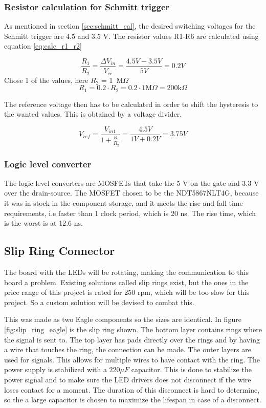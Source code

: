 \subsubsection*{Resistor calculation for Schmitt trigger}
As mentioned in section \ref{sec:schmitt_cal}, the desired switching voltages for the Schmitt trigger are 4.5 and 3.5 V.
The resistor values R1-R6 are calculated using equation \ref{eq:calc_r1_r2}\cite{book:prac_ele}

\begin{equation}\label{eq:calc_r1_r2}
 \frac{R_1}{R_2} = \frac{\Delta V_{in}}{V_{cc}} = \frac{4.5V-3.5V}{5V} = 0.2V
\end{equation}
Chose 1 of the values, here $R_2$ = 1\ M$\Omega$
\begin{equation}
 R_1 = 0.2\cdot R_2 = 0.2\cdot 1 \text{M} \Omega = 200 \text{k}\Omega
\end{equation}

The reference voltage then has to be calculated in order to shift the hysteresis to the wanted values.
This is obtained by a voltage divider.

\begin{equation}
 V_{ref} = \frac{V_{in1}}{1+\frac{R_1}{R_2}} = \frac{4.5V}{1V+0.2V} = 3.75 V
\end{equation}

\subsubsection*{Logic level converter}

The logic level converters are MOSFETs that take the 5 V on the gate and 3.3 V over the drain-source.
The MOSFET chosen to be the NDT5867NLT4G, because it was in stock in the component storage, and it meets the rise and fall time requirements, i.e faster than 1 clock period, which is 20 ns.
The rise time, which is the worst is at 12.6 ns.

\subsection{Slip Ring Connector}\label{sec:ring_connector}
The board with the LEDs will be rotating, making the communication to this board a problem.
Existing solutions called slip rings exist, but the ones in the price range of this project is rated for 250 rpm, which will be too slow for this project.
So a custom solution will be devised to combat this.

This was made as two Eagle components so the sizes are identical.
In figure \ref{fig:slip_ring_eagle} is the slip ring shown.
The bottom layer contains rings where the signal is sent to.
The top layer has pads directly over the rings and by having a wire that touches the ring, the connection can be made.
The outer layers are used for signals.
This allows for multiple wires to have contact with the ring.
The power supply is stabilized with a $220 \mu F$ capacitor.
This is done to stabilize the power signal and to make sure the LED drivers does not disconnect if the wire loses contact for a moment.
The duration of this disconnect is hard to determine, so the a large capacitor is chosen to maximize the lifespan in case of a disconnect.

